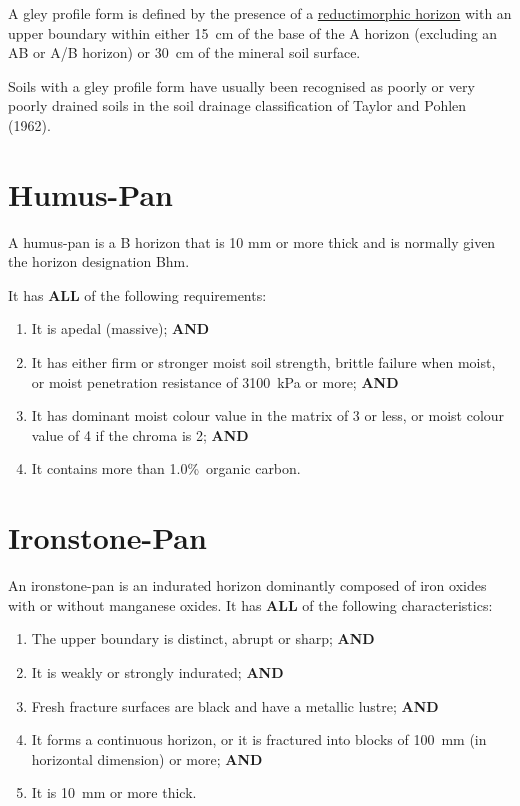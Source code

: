 \documentclass[
  letterpaper,
  DIV=11,
  numbers=noendperiod]{scrreprt}
\providecommand{\tightlist}{%
  \setlength{\itemsep}{0pt}\setlength{\parskip}{0pt}}\usepackage{longtable,booktabs,array}
\begin{document}
A gley profile form is defined by the presence of a
\protect\hyperlink{sec-diag-redmh}{reductimorphic horizon} with an upper
boundary within either 15~cm of the base of the A horizon (excluding an
AB or A/B horizon) or 30~cm of the mineral soil surface.

Soils with a gley profile form have usually been recognised as poorly or
very poorly drained soils in the soil drainage classification of Taylor
and Pohlen (1962).

\hypertarget{sec-diag-hpan}{%
\section{Humus-Pan}\label{sec-diag-hpan}}

A humus-pan is a B horizon that is 10 mm or more thick and is normally
given the horizon designation Bhm.

It has \textbf{ALL} of the following requirements:

\begin{enumerate}
\def\labelenumi{\arabic{enumi}.}
\tightlist
\item
  It is apedal (massive); \textbf{AND}
\item
  It has either firm or stronger moist soil strength, brittle failure
  when moist, or moist penetration resistance of 3100~kPa or more;
  \textbf{AND}
\item
  It has dominant moist colour value in the matrix of 3 or less, or
  moist colour value of 4 if the chroma is 2; \textbf{AND}
\item
  It contains more than 1.0\%~organic carbon.
\end{enumerate}

\hypertarget{sec-diag-ipan}{%
\section{Ironstone-Pan}\label{sec-diag-ipan}}

An ironstone-pan is an indurated horizon dominantly composed of iron
oxides with or without manganese oxides. It has \textbf{ALL} of the
following characteristics:

\begin{enumerate}
\def\labelenumi{\arabic{enumi}.}
\tightlist
\item
  The upper boundary is distinct, abrupt or sharp; \textbf{AND}
\item
  It is weakly or strongly indurated; \textbf{AND}
\item
  Fresh fracture surfaces are black and have a metallic lustre;
  \textbf{AND}
\item
  It forms a continuous horizon, or it is fractured into blocks of
  100~mm (in horizontal dimension) or more; \textbf{AND}
\item
  It is 10~mm or more thick.
\end{enumerate}
\end{document}
